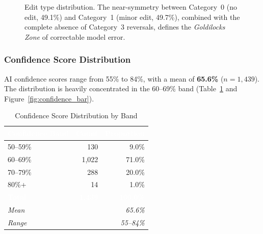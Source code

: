 \documentclass[11pt,a4paper]{article}
\begin{document}
\begin{figure}[H]
\centering
{}
\caption{Edit type distribution. The near-symmetry between Category~0 (no edit,
49.1\%) and Category~1 (minor edit, 49.7\%), combined with the complete absence of
Category~3 reversals, defines the \textit{Goldilocks Zone} of correctable model error.}
\label{fig:edit_bar}
\end{figure}

\subsubsection{Confidence Score Distribution}

AI confidence scores range from 55\% to 84\%, with a mean of \textbf{65.6\%}
($n = 1{,}439$). The distribution is heavily concentrated in the 60--69\% band
(Table~\ref{tab:confidence} and Figure~\ref{fig:confidence_bar}).

\begin{table}[H]
\centering
\caption{Confidence Score Distribution by Band}
\label{tab:confidence}
\renewcommand{\arraystretch}{1.3}
\begin{tabular}{lrr}
\toprule
\rowcolor{headerblue}
\textcolor{white}{\textbf{Confidence Band}} &
\textcolor{white}{\textbf{Count}} &
\textcolor{white}{\textbf{Proportion}} \\
\midrule
50--59\%  &  130 &  9.0\% \\
\rowcolor{rowgray}
60--69\%  & 1{,}022 & 71.0\% \\
70--79\%  &  288 & 20.0\% \\
\rowcolor{rowgray}
80\%+     &   14 &  1.0\% \\
\midrule
\rowcolor{headerblue}
\textcolor{white}{\textbf{Total}} &
\textcolor{white}{\textbf{1,439}} &
\textcolor{white}{\textbf{100.0\%}} \\
\midrule
\multicolumn{2}{l}{\textit{Mean}}  & \textit{65.6\%} \\
\multicolumn{2}{l}{\textit{Range}} & \textit{55--84\%} \\
\bottomrule
\end{tabular}
\end{table}
\end{document}
